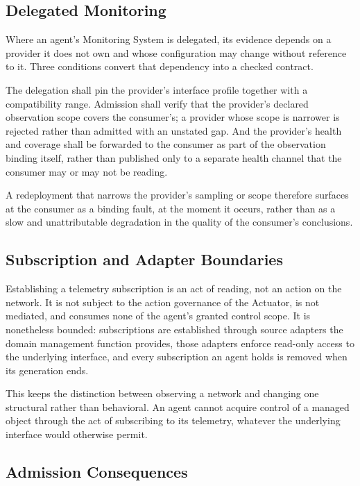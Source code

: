 \hypertarget{delegated-monitoring}{%
\subsection{Delegated Monitoring}\label{delegated-monitoring}}

Where an agent's Monitoring System is delegated, its evidence depends on
a provider it does not own and whose configuration may change without
reference to it. Three conditions convert that dependency into a checked
contract.

The delegation shall pin the provider's interface profile together with
a compatibility range. Admission shall verify that the provider's
declared observation scope covers the consumer's; a provider whose scope
is narrower is rejected rather than admitted with an unstated gap. And
the provider's health and coverage shall be forwarded to the consumer as
part of the observation binding itself, rather than published only to a
separate health channel that the consumer may or may not be reading.

A redeployment that narrows the provider's sampling or scope therefore
surfaces at the consumer as a binding fault, at the moment it occurs,
rather than as a slow and unattributable degradation in the quality of
the consumer's conclusions.

\hypertarget{subscription-and-adapter-boundaries}{%
\subsection{Subscription and Adapter Boundaries}\label{subscription-and-adapter-boundaries}}

Establishing a telemetry subscription is an act of reading, not an
action on the network. It is not subject to the action governance of the
Actuator, is not mediated, and consumes none of the agent's granted
control scope. It is nonetheless bounded: subscriptions are established
through source adapters the domain management function provides, those
adapters enforce read-only access to the underlying interface, and every
subscription an agent holds is removed when its generation ends.

This keeps the distinction between observing a network and changing one
structural rather than behavioral. An agent cannot acquire control of a
managed object through the act of subscribing to its telemetry, whatever
the underlying interface would otherwise permit.

\hypertarget{admission-consequences}{%
\subsection{Admission Consequences}\label{admission-consequences}}

